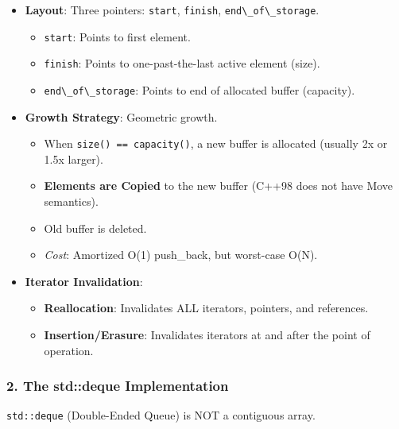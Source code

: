 \begin{itemize}
\tightlist
\item
  \textbf{Layout}: Three pointers: \passthrough{\lstinline!start!},
  \passthrough{\lstinline!finish!},
  \passthrough{\lstinline!end\_of\_storage!}.

  \begin{itemize}
  \tightlist
  \item
    \passthrough{\lstinline!start!}: Points to first element.
  \item
    \passthrough{\lstinline!finish!}: Points to one-past-the-last active
    element (size).
  \item
    \passthrough{\lstinline!end\_of\_storage!}: Points to end of
    allocated buffer (capacity).
  \end{itemize}
\item
  \textbf{Growth Strategy}: Geometric growth.

  \begin{itemize}
  \tightlist
  \item
    When \passthrough{\lstinline!size() == capacity()!}, a new buffer is
    allocated (usually 2x or 1.5x larger).
  \item
    \textbf{Elements are Copied} to the new buffer (C++98 does not have
    Move semantics).
  \item
    Old buffer is deleted.
  \item
    \emph{Cost}: Amortized O(1) push\_back, but worst-case O(N).
  \end{itemize}
\item
  \textbf{Iterator Invalidation}:

  \begin{itemize}
  \tightlist
  \item
    \textbf{Reallocation}: Invalidates ALL iterators, pointers, and
    references.
  \item
    \textbf{Insertion/Erasure}: Invalidates iterators at and after the
    point of operation.
  \end{itemize}
\end{itemize}

\hypertarget{the-stddeque-implementation}{%
\subsubsection{2. The std::deque
Implementation}\label{the-stddeque-implementation}}

\passthrough{\lstinline!std::deque!} (Double-Ended Queue) is NOT a
contiguous array.

